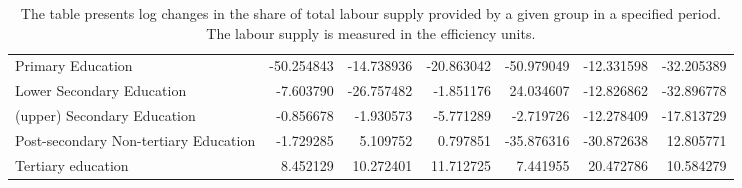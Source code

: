 \documentclass[11pt]{article}
\begin{document}
\begin{table}[!htbp]
\begin{center}
{\begin{tabular}{lrrrrrr}
Primary Education                     & -50.254843 & -14.738936 & -20.863042 & -50.979049 &  -12.331598 & -32.205389 \\
Lower Secondary Education             &  -7.603790 & -26.757482 &  -1.851176 &  24.034607 &  -12.826862 & -32.896778 \\
(upper) Secondary Education           &  -0.856678 &  -1.930573 &  -5.771289 &  -2.719726 &  -12.278409 & -17.813729 \\
Post-secondary Non-tertiary Education &  -1.729285 &   5.109752 &   0.797851 & -35.876316 &  -30.872638 &  12.805771 \\
Tertiary education                    &   8.452129 &  10.272401 &  11.712725 &   7.441955 &   20.472786 &  10.584279 \\
\bottomrule
\end{tabular}

}
\caption*{ \footnotesize The table presents log changes in the share of total labour supply provided by a given group in a specified period. The labour supply is measured in the efficiency units.}
\end{center}
\end{table}


\end{document}
